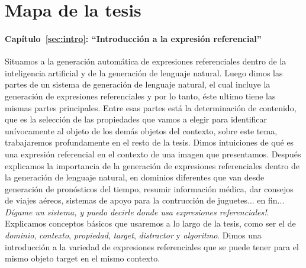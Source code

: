 
\section{Mapa de la tesis}
\label{sec:mapadetesis}
\paragraph{Cap\'itulo~\ref{sec:intro}: ``Introducci\'on a la expresi\'on referencial''} Situamos a la generaci\'on autom\'atica de expresiones 
referenciales dentro de la inteligencia artificial y de la generaci\'on de lenguaje natural. Luego dimos las partes de un sistema de 
generaci\'on de lenguaje natural, el cual incluye la generaci\'on de expresiones referenciales y por lo tanto, \'este ultimo tiene las mismas 
partes principales. Entre esas partes est\'a la determinaci\'on de contenido, que es la selecci\'on de las propiedades que vamos a elegir 
para identificar un\'ivocamente al objeto de los dem\'as objetos del contexto, sobre este tema, trabajaremos profundamente en el resto de la 
tesis. Dimos intuiciones de qu\'e es una expresi\'on referencial en el contexto de una imagen que presentamos. Despu\'es explicamos la 
importancia de la generaci\'on de expresiones referenciales dentro de la generaci\'on de lenguaje natural, en 
dominios diferentes que van desde generaci\'on de pron\'osticos del tiempo, resumir informaci\'on m\'edica, dar consejos de viajes a\'ereos, 
sistemas de apoyo para la contrucci\'on de juguetes... en fin... {\it D\'igame un sistema, y puedo decirle donde usa expresiones 
referenciales!}. Explicamos conceptos b\'asicos que usaremos a lo largo de la tesis, como ser el de {\it dominio}, {\it contexto}, 
{\it propiedad}, {\it target}, {\it distractor} y {\it algoritmo}. Dimos una introducci\'on a la variedad de expresiones referenciales que 
se puede tener para el mismo objeto target en el mismo contexto.

